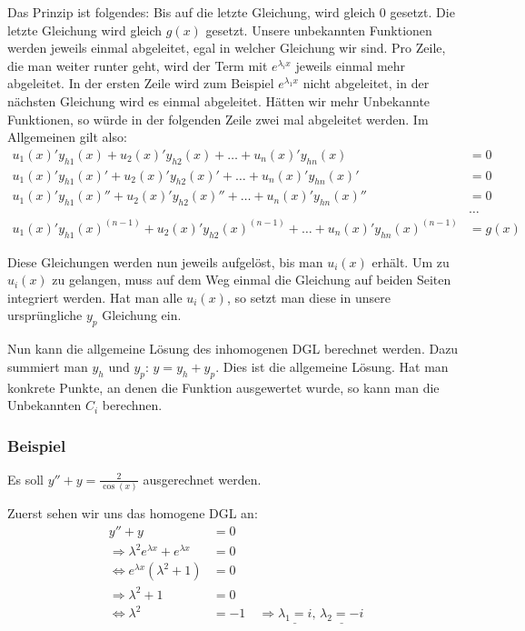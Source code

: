 Das Prinzip ist folgendes: Bis auf die letzte Gleichung, wird gleich $0$ gesetzt.
Die letzte Gleichung wird gleich $g(x)$ gesetzt.
Unsere unbekannten Funktionen werden jeweils einmal abgeleitet, egal in welcher
Gleichung wir sind. Pro Zeile, die man weiter runter geht, wird der Term mit $e^{\lambda_i x}$
jeweils einmal mehr abgeleitet. In der ersten Zeile wird zum Beispiel $e^{\lambda_1 x}$ nicht abgeleitet,
in der nächsten Gleichung wird es einmal abgeleitet. Hätten wir mehr Unbekannte Funktionen,
so würde in der folgenden Zeile zwei mal abgeleitet werden. Im Allgemeinen gilt also:
{\footnotesize
\begin{align*}
u_1(x)' y_{h1}(x) + u_2(x)' y_{h2}(x) + \ldots + u_n(x)' y_{hn}(x) &= 0\\
u_1(x)' y_{h1}(x)' + u_2(x)' y_{h2}(x)' + \ldots + u_n(x)' y_{hn}(x)' &= 0\\
u_1(x)' y_{h1}(x)'' + u_2(x)' y_{h2}(x)'' + \ldots + u_n(x)' y_{hn}(x)'' &= 0\\
&\ldots\\
u_1(x)' y_{h1}(x)^{(n-1)} + u_2(x)' y_{h2}(x)^{(n-1)} + \ldots + u_n(x)' y_{hn}(x)^{(n-1)} &= g(x)
\end{align*}
}

Diese Gleichungen werden nun jeweils aufgelöst, bis man $u_i(x)$ erhält. Um zu
$u_i(x)$ zu gelangen, muss auf dem Weg einmal die Gleichung auf beiden Seiten
integriert werden. Hat man alle $u_i(x)$, so setzt man diese in unsere
ursprüngliche $y_p$ Gleichung ein.

Nun kann die allgemeine Lösung des inhomogenen DGL berechnet werden. Dazu
summiert man $y_h$ und $y_p$: $y = y_h + y_p$. Dies ist die allgemeine Lösung.
Hat man konkrete Punkte, an denen die Funktion ausgewertet wurde, so kann man
die Unbekannten $C_i$ berechnen.

\subsubsection*{Beispiel}
Es soll $y'' + y = \frac{2}{\cos(x)}$ ausgerechnet werden.

Zuerst sehen wir uns das homogene DGL an:
\begin{align*}
y'' + y &= 0\\
\Rightarrow \lambda^2 e^{\lambda x} + e^{\lambda x} &= 0\\
\Leftrightarrow e^{\lambda x} (\lambda^2 + 1) &=0 \\
\Rightarrow \lambda^2 + 1 &= 0\\
\Leftrightarrow \lambda^2 &= -1 \quad
\Rightarrow \underline{\lambda_1 = i},\, \underline{\lambda_2 = -i}
\end{align*}

